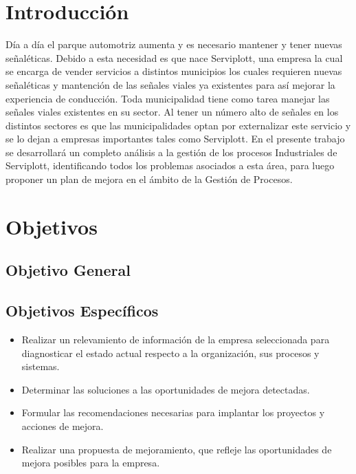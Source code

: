 %
%

\section{Introducción}
Día a día el parque automotriz aumenta y es necesario mantener y tener nuevas señaléticas. Debido a esta necesidad es que nace Serviplott, una empresa la cual se encarga de vender servicios a distintos municipios los cuales requieren nuevas señaléticas y mantención de las señales viales ya existentes para así mejorar la experiencia de conducción.
\vspace{5mm}
Toda municipalidad tiene como tarea manejar las señales viales existentes en su sector. Al tener un número alto de señales en los distintos sectores es que las municipalidades optan por externalizar este servicio y se lo dejan a empresas importantes tales como Serviplott.
\vspace{5mm}
En el presente trabajo se desarrollará un completo análisis a la gestión de los procesos Industriales de Serviplott, identificando todos los problemas asociados a esta área, para luego proponer un plan de mejora en el ámbito de la Gestión de Procesos.
\vspace{5mm}
\newpage
\section{Objetivos}
	\subsection{Objetivo General}
	\subsection{Objetivos Específicos}
	\begin{itemize}

		\item Realizar un relevamiento de información de la empresa seleccionada para 					diagnosticar el estado actual respecto a la organización, sus procesos 				y sistemas.
		\item Determinar las soluciones a las oportunidades de mejora detectadas.
		\item Formular las recomendaciones necesarias para implantar los proyectos y
		acciones de mejora.
		\item Realizar una propuesta de mejoramiento, que refleje las oportunidades de 		mejora posibles para la empresa.
	\end{itemize}
